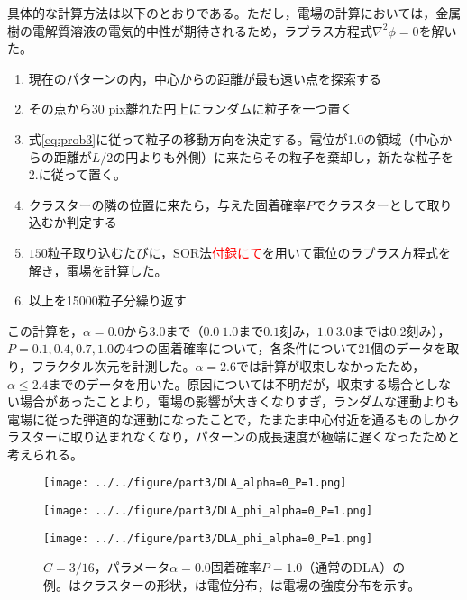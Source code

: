\documentclass[autodetect-engine,dvi=dvipdfmx,a4paper,ja=standard,oneside,openany,11pt,draft]{bxjsbook}
\begin{document}
具体的な計算方法は以下のとおりである。ただし，電場の計算においては，金属樹の電解質溶液の電気的中性が期待されるため，ラプラス方程式$\nabla^2\phi=0$を解いた。
\begin{enumerate}
  \item 現在のパターンの内，中心からの距離が最も遠い点を探索する
  \item その点から30 pix離れた円上にランダムに粒子を一つ置く
  \item 式\ref{eq:prob3}に従って粒子の移動方向を決定する。電位が1.0の領域（中心からの距離が$L/2$の円よりも外側）に来たらその粒子を棄却し，新たな粒子を2.に従って置く。
  \item クラスターの隣の位置に来たら，与えた固着確率$P$でクラスターとして取り込むか判定する
  \item $150$粒子取り込むたびに，SOR法\textcolor{red}{付録にて}を用いて電位のラプラス方程式を解き，電場を計算した。
  \item 以上を15000粒子分繰り返す
\end{enumerate}
この計算を，$\alpha=0.0$から$3.0$まで（$0.0~1.0$まで$0.1$刻み，$1.0~3.0$までは0.2刻み），$P=0.1,0.4,0.7,1.0$の4つの固着確率について，各条件について21個のデータを取り，フラクタル次元を計測した。$\alpha=2.6$では計算が収束しなかったため，$\alpha\leq2.4$までのデータを用いた。原因については不明だが，収束する場合としない場合があったことより，電場の影響が大きくなりすぎ，ランダムな運動よりも電場に従った弾道的な運動になったことで，たまたま中心付近を通るものしかクラスターに取り込まれなくなり，パターンの成長速度が極端に遅くなったためと考えられる。
\begin{figure}[htbp]
  \begin{minipage}{0.32\hsize}
    \subcaption{}
    \centering
    \texttt{[image: ../../figure/part3/DLA\_alpha=0\_P=1.png]}
    \label{fig:DLA_alpha_0_P_1}
  \end{minipage}
  \begin{minipage}{0.32\hsize}
    \subcaption{}
    \centering
    \texttt{[image: ../../figure/part3/DLA\_phi\_alpha=0\_P=1.png]}
    \label{fig:DLA_phi_alpha_0_P_1}
  \end{minipage}
  \begin{minipage}{0.32\hsize}
    \subcaption{}
    \centering
    \texttt{[image: ../../figure/part3/DLA\_phi\_alpha=0\_P=1.png]}
    \label{fig:DLA_E_alpha_0_P_1}
  \end{minipage}
  \caption{$C=3/16$，パラメータ$\alpha=0.0$固着確率$P=1.0$（通常のDLA）の例。はクラスターの形状，は電位分布，は電場の強度分布を示す。}
  \label{fig:DLA_ex}
\end{figure}
\end{document}
